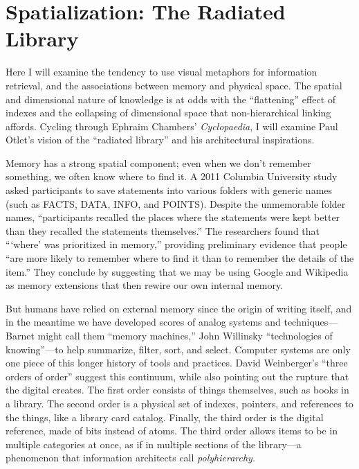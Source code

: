 \section{Spatialization: The Radiated Library}

Here I will examine the tendency to use visual metaphors for information retrieval, and the associations between memory and physical space. The spatial and dimensional nature of knowledge is at odds with the ``flattening'' effect of indexes and the collapsing of dimensional space that non-hierarchical linking affords. Cycling through Ephraim Chambers' \emph{Cyclopaedia}, I will examine Paul Otlet's vision of the ``radiated library'' and his architectural inspirations.

Memory has a strong spatial component; even when we don't remember something, we often know where to find it. A 2011 Columbia University study asked participants to save statements into various folders with generic names (such as FACTS, DATA, INFO, and POINTS). Despite the unmemorable folder names, ``participants recalled the places where the statements were kept better than they recalled the statements themselves.'' The researchers found that ``\thinspace `where' was prioritized in memory,'' providing preliminary evidence that people ``are more likely to remember where to find it than to remember the details of the item.''\autocite{sparrow_google_2011} They conclude by suggesting that we may be using Google and Wikipedia as memory extensions that then rewire our own internal memory.

But humans have relied on external memory since the origin of writing itself, and in the meantime we have developed scores of analog systems and techniques---Barnet might call them ``memory machines,'' John Willinsky ``technologies of knowing''---to help summarize, filter, sort, and select.\autocite{barnet_memory_2013,willinsky_technologies_1999} Computer systems are only one piece of this longer history of tools and practices. David Weinberger's ``three orders of order'' suggest this continuum, while also pointing out the rupture that the digital creates. The first order consists of things themselves, such as books in a library. The second order is a physical set of indexes, pointers, and references to the things, like a library card catalog. Finally, the third order is the digital reference, made of bits instead of atoms.\autocite[17-23]{weinberger_everything_2008} The third order allows items to be in multiple categories at once, as if in multiple sections of the library---a phenomenon that information architects call \emph{polyhierarchy}.\autocite{debrouwere_information_2010}

